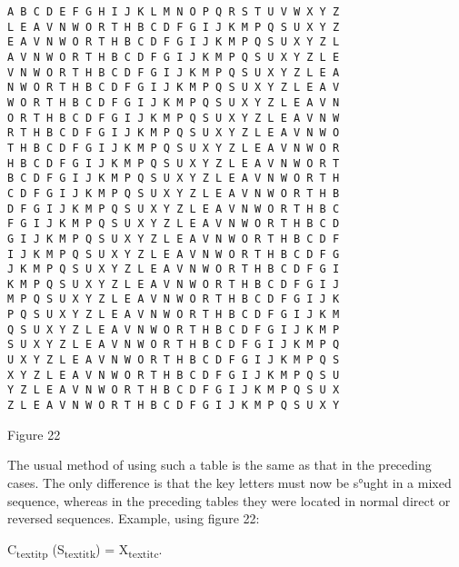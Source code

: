 \begin{textfigure}
        \begin{verbatim}
A B C D E F G H I J K L M N O P Q R S T U V W X Y Z
L E A V N W O R T H B C D F G I J K M P Q S U X Y Z
E A V N W O R T H B C D F G I J K M P Q S U X Y Z L
A V N W O R T H B C D F G I J K M P Q S U X Y Z L E
V N W O R T H B C D F G I J K M P Q S U X Y Z L E A
N W O R T H B C D F G I J K M P Q S U X Y Z L E A V
W O R T H B C D F G I J K M P Q S U X Y Z L E A V N
O R T H B C D F G I J K M P Q S U X Y Z L E A V N W
R T H B C D F G I J K M P Q S U X Y Z L E A V N W O
T H B C D F G I J K M P Q S U X Y Z L E A V N W O R
H B C D F G I J K M P Q S U X Y Z L E A V N W O R T
B C D F G I J K M P Q S U X Y Z L E A V N W O R T H
C D F G I J K M P Q S U X Y Z L E A V N W O R T H B
D F G I J K M P Q S U X Y Z L E A V N W O R T H B C
F G I J K M P Q S U X Y Z L E A V N W O R T H B C D
G I J K M P Q S U X Y Z L E A V N W O R T H B C D F
I J K M P Q S U X Y Z L E A V N W O R T H B C D F G
J K M P Q S U X Y Z L E A V N W O R T H B C D F G I
K M P Q S U X Y Z L E A V N W O R T H B C D F G I J
M P Q S U X Y Z L E A V N W O R T H B C D F G I J K
P Q S U X Y Z L E A V N W O R T H B C D F G I J K M
Q S U X Y Z L E A V N W O R T H B C D F G I J K M P
S U X Y Z L E A V N W O R T H B C D F G I J K M P Q
U X Y Z L E A V N W O R T H B C D F G I J K M P Q S
X Y Z L E A V N W O R T H B C D F G I J K M P Q S U
Y Z L E A V N W O R T H B C D F G I J K M P Q S U X
Z L E A V N W O R T H B C D F G I J K M P Q S U X Y
        \end{verbatim}
        \caption{Figure 22}
\end{textfigure}

The usual method of using such a table is the same as that in the preceding cases. The only difference is that the key letters must now be
s°ught in a mixed sequence, whereas in the preceding tables they were
located in normal direct or reversed sequences. Example, using ﬁgure 22:

C\textsubscript{textit{p}} (S\textsubscript{textit{k}}) = X\textsubscript{textit{c}}.

